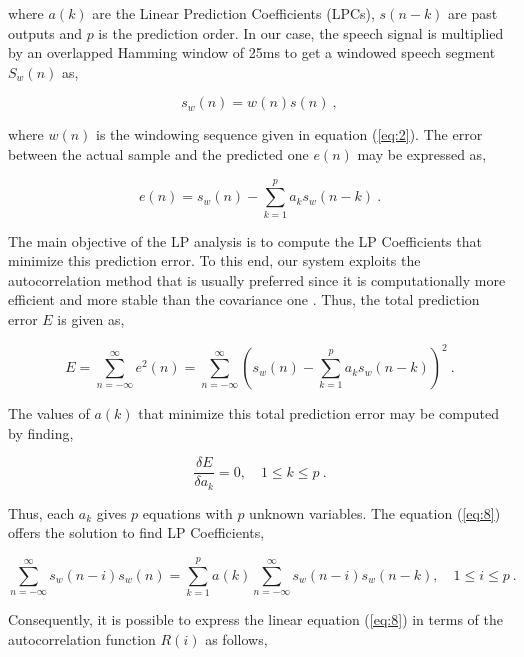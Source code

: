 \documentclass[cryptography,article,submit,moreauthors,pdftex,10pt,a4paper]{mdpi}
\begin{document}
\noindent where $a(k)$ are the Linear Prediction Coefficients (LPCs), $s(n-k)$ are past outputs and $p$ is the prediction order. In our case, the speech signal is multiplied by an overlapped Hamming window of 25ms to get a windowed speech segment $S_w (n)$ as,

\begin{equation}
\label{eq:4}
  s_w(n) = w(n)s(n)~,
\end{equation}

\noindent where $w(n)$ is the windowing sequence given in equation (\ref{eq:2}). The error between the actual sample and the predicted one $e(n)$ may be expressed as,

\begin{equation}
\label{eq:5}
  e(n) = s_w(n)-\sum\limits_{k=1}^{p}a_ks_w(n-k)~.
\end{equation}

The main objective of the LP analysis is to compute the LP Coefficients that minimize this prediction error. To this end, our system exploits the autocorrelation method that is usually preferred since it is computationally more efficient and more stable than the covariance one \cite{29}. Thus, the total prediction error $E$ is given as,

\begin{equation}
\label{eq:6}
	E = \sum\limits_{n=-\infty}^{\infty}e^2(n)=\sum\limits_{n=-\infty}^{\infty} 								\left(s_w(n)-\sum\limits_{k=1}^{p}a_ks_w(n-k)\right) ^2~.
\end{equation}

The values of $a(k)$ that minimize this total prediction error may be computed by finding,

\begin{equation}
\label{eq:7}
  	\frac{\delta E}{\delta a_k} = 0,\quad 1\leq k \leq p~.
\end{equation}

Thus, each $a_k$ gives $p$ equations with $p$ unknown variables. The equation (\ref{eq:8}) offers the solution to find LP Coefficients,

\begin{equation}
\label{eq:8}
	\sum\limits_{n=-\infty}^{\infty}s_w(n-i)s_w(n)=\sum\limits_{k=1}^{p}a(k)\sum\limits_{n=-\infty}^{\infty}s_w(n-i)s_w(n-k),\quad 1\leq i \leq p~.
\end{equation}

Consequently, it is possible to express the linear equation (\ref{eq:8}) in terms of the autocorrelation function $R(i)$ as follows,
\end{document}
